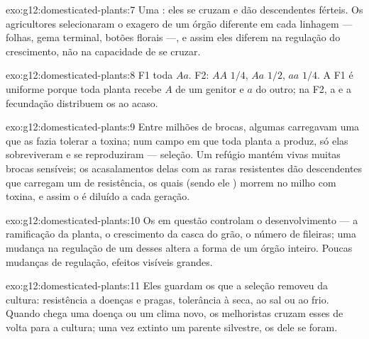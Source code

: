 \begin{solution}{exo:g12:domesticated-plants:7}
Uma : eles se cruzam e dão descendentes férteis. Os agricultores
selecionaram o exagero de um órgão diferente em cada linhagem ---
folhas, gema terminal, botões florais ---, e assim eles diferem na
regulação do crescimento, não na capacidade de se cruzar.
\end{solution}

\begin{solution}{exo:g12:domesticated-plants:8}
F1 toda $Aa$. F2: $AA$ $1/4$, $Aa$ $1/2$, $aa$ $1/4$. A F1 é uniforme
porque toda planta recebe $A$ de um genitor e $a$ do outro; na F2, a
 e a fecundação distribuem os  ao acaso.
\end{solution}

\begin{solution}{exo:g12:domesticated-plants:9}
Entre milhões de brocas, algumas carregavam uma  que as fazia
tolerar a toxina; num campo em que toda planta a produz, só elas
sobreviveram e se reproduziram --- seleção. Um refúgio mantém vivas
muitas brocas sensíveis; os acasalamentos delas com as raras
resistentes dão descendentes que carregam um  de resistência, os
quais (sendo ele ) morrem no milho com toxina, e assim o 
é diluído a cada geração.
\end{solution}

\begin{solution}{exo:g12:domesticated-plants:10}
Os  em questão controlam o desenvolvimento --- a ramificação da
planta, o crescimento da casca do grão, o número de fileiras; uma
mudança na regulação de um  desses altera a forma de um órgão
inteiro. Poucas mudanças de regulação, efeitos visíveis grandes.
\end{solution}

\begin{solution}{exo:g12:domesticated-plants:11}
Eles guardam os  que a seleção removeu da cultura: resistência a
doenças e pragas, tolerância à seca, ao sal ou ao frio. Quando chega
uma doença ou um clima novo, os melhoristas cruzam esses  de
volta para a cultura; uma vez extinto um parente silvestre, os 
dele se foram.
\end{solution}

